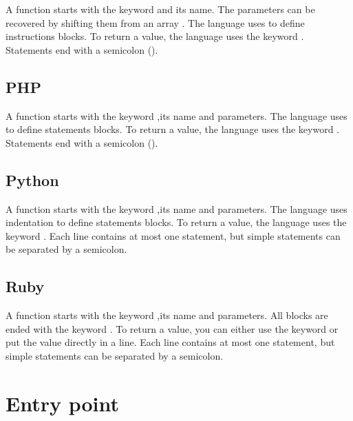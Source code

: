 \documentclass{KodeBook}
\begin{document}
A function starts with the keyword  and its name.
The parameters can be recovered by shifting them from an array .
The language uses \keyword{\{\}} to define instructions blocks.
To return a value, the language uses the keyword .
Statements end with a semicolon (\keyword{;}).



\subsection{PHP}

A function starts with the keyword ,its name and parameters.
The language uses \keyword{\{\}} to define statements blocks.
To return a value, the language uses the keyword .
Statements end with a semicolon (\keyword{;}).



\subsection{Python}

A function starts with the keyword ,its name and parameters.
The language uses indentation to define statements blocks.
To return a value, the language uses the keyword .
Each line contains at most one statement, but simple statements can be separated by a semicolon.



\subsection{Ruby}

A function starts with the keyword ,its name and parameters.
All blocks are ended with the keyword .
To return a value, you can either use the keyword  or put the value directly in a line.
Each line contains at most one statement, but simple statements can be separated by a semicolon.




\section{Entry point}
\end{document}
